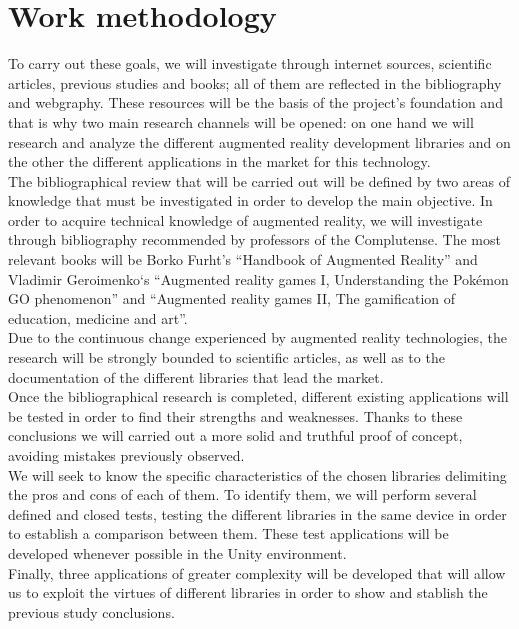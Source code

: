 \newpage
\section*{Work methodology}
To carry out these goals, we will investigate through internet sources, scientific articles, previous studies and books; all of them are reflected in the bibliography and webgraphy. These resources will be the basis of the project's foundation and that is why two main research channels will be opened: on one hand we will research and analyze the different augmented reality development libraries and on the other the different applications in the market for this technology.\\


The bibliographical review that will be carried out will be defined by two areas of knowledge that must be investigated in order to develop the main objective. In order to acquire technical knowledge of augmented reality, we will investigate through bibliography recommended by professors of the Complutense. The most relevant books will be Borko Furht's “Handbook of Augmented Reality” and Vladimir Geroimenko‘s “Augmented reality games I, Understanding the Pokémon GO phenomenon” and “Augmented reality games II, The gamification of education, medicine and art”.\\

Due to the continuous change experienced by augmented reality technologies, the research will be strongly bounded to scientific articles, as well as to the documentation of the different libraries that lead the market.\\

Once the bibliographical research is completed, different existing applications will be tested in order to find their strengths and weaknesses. Thanks to these conclusions we will carried out a more solid and truthful proof of concept, avoiding mistakes previously observed.\\

We will seek to know the specific characteristics of the chosen libraries delimiting the pros and cons of each of them. To identify them, we will perform several defined and closed tests, testing the different libraries in the same device in order to establish a comparison between them. These test applications will be developed whenever possible in the Unity environment.\\

Finally, three applications of greater complexity will be developed that will allow us to exploit the virtues of different libraries in order to show and stablish the previous study conclusions.\\

